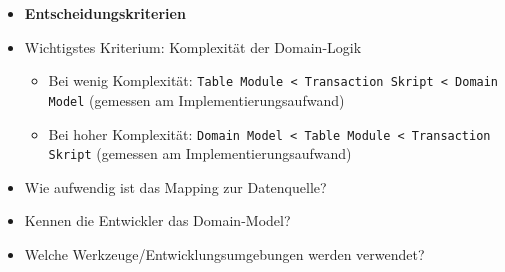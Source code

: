 \begin{itemize}
	\item \textbf{Entscheidungskriterien}
		\item Wichtigstes Kriterium: Komplexität der Domain-Logik
		\begin{itemize}
			\item Bei wenig Komplexität: \texttt{Table Module < Transaction Skript < Domain Model} (gemessen am Implementierungsaufwand)
			\item Bei hoher Komplexität: \texttt{Domain Model < Table Module < Transaction Skript} (gemessen am Implementierungsaufwand)
		\end{itemize}
		\item Wie aufwendig ist das Mapping zur Datenquelle?
		\item Kennen die Entwickler das Domain-Model?
		\item Welche Werkzeuge/Entwicklungsumgebungen werden verwendet?
\end{itemize}

